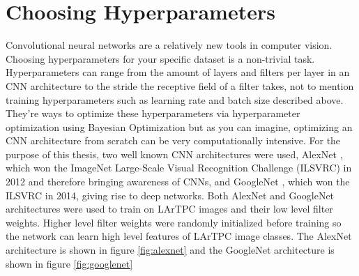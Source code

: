 \section{Choosing Hyperparameters}
Convolutional neural networks are a relatively new tools in computer vision. Choosing hyperparameters for your specific dataset is a non-trivial task. Hyperparameters can range from the amount of layers and filters per layer in an CNN architecture to the stride the receptive field of a filter takes, not to mention training hyperparameters such as learning rate and batch size described above. They're ways to optimize these hyperparameters via hyperparameter optimization using Bayesian Optimization \cite{optimization} but as you can imagine, optimizing an CNN architecture from scratch can be very computationally intensive. For the purpose of this thesis, two well known CNN architectures were used, AlexNet \cite{alexnet}, which won the ImageNet Large-Scale Visual Recognition Challenge (ILSVRC) in 2012 and therefore bringing awareness of CNNs, and GoogleNet \cite{googlenet}, which won the ILSVRC in 2014, giving rise to deep networks. Both AlexNet and GoogleNet architectures were used to train on LArTPC images and their low level filter weights. Higher level filter weights were randomly initialized before training so the network can learn high level features of LArTPC image classes. The AlexNet architecture is shown in figure \ref{fig:alexnet} and the GoogleNet architecture is shown in figure \ref{fig:googlenet}

